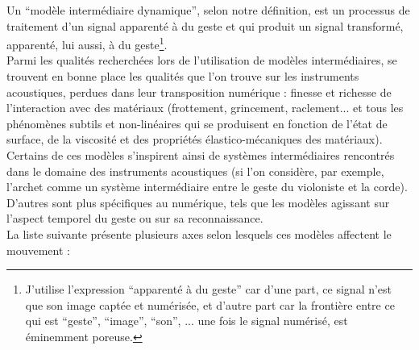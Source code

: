 \noindent Un ``modèle intermédiaire dynamique'', selon notre définition, est un processus de traitement d'un signal apparenté à du geste et qui produit un signal transformé, apparenté, lui aussi, à du geste\footnote{J'utilise l'expression ``apparenté à du geste'' car d'une part, ce signal n'est que son image captée et numérisée, et d'autre part car la frontière entre ce qui est ``geste'', ``image'', ``son'', ... une fois le signal numérisé, est éminemment poreuse.}.\\
\indent Parmi les qualités recherchées lors de l'utilisation de modèles intermédiaires, se trouvent en bonne place les qualités que l'on trouve sur les instruments acoustiques, perdues dans leur transposition numérique : finesse et richesse de l'interaction avec des matériaux (frottement, grincement, raclement... et tous les phénomènes subtils et non-linéaires qui se produisent en fonction de l'état de surface, de la viscosité et des propriétés élastico-mécaniques des matériaux). Certains de ces modèles s'inspirent ainsi de systèmes intermédiaires rencontrés dans le domaine des instruments acoustiques (si l'on considère, par exemple, l'archet comme un système intermédiaire entre le geste du violoniste et la corde). D'autres sont plus spécifiques au numérique, tels que les modèles agissant sur l'aspect temporel du geste ou sur sa reconnaissance.\\
\indent La liste suivante présente plusieurs axes selon lesquels ces modèles affectent le mouvement :
\vspace{-1em}
